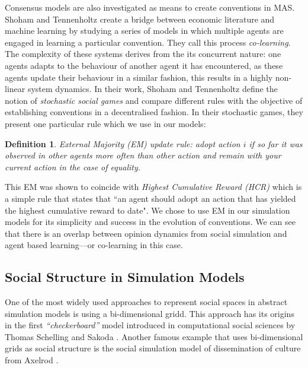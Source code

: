 \documentclass[preprint,number]{elsarticle}
\newtheorem{mydef}{Definition}
\begin{document}
	Consensus models are also investigated as means to create conventions in MAS. Shoham and Tennenholtz \cite{Shoham1994} create a bridge between economic literature and machine learning by studying a series of models in which multiple agents are engaged in learning a particular convention. They call this process \textit{co-learning}. The complexity of these systems derives from the its concurrent nature: one agents adapts to the behaviour of another agent it has encountered, as these agents update their behaviour in a similar fashion, this results in a highly non-linear system dynamics. In their work, Shoham and Tennenholtz define the notion of \textit{stochastic social games} and compare different rules with the objective of establishing conventions in a decentralised fashion. In their stochastic games, they present one particular rule which we use in our models: 
	
	\begin{mydef}
		\label{def:external-majority}
		\textit{External Majority (EM)} update rule: adopt action $i$ if so far it was observed in other agents more often than other action and remain with your current action in the case of equality. 
	\end{mydef}
	
	This EM was shown to coincide with \textit{Highest Cumulative Reward (HCR)} which is a simple rule that states that ``an agent should adopt an action that has yielded the highest cumulative reward to date". We chose to use EM in our simulation models for its simplicity and success in the evolution of conventions. We can see that there is an overlap between opinion dynamics from social simulation and agent based learning---or co-learning in this case.
	
	\subsection{Social Structure in Simulation Models}
	One of the most widely used approaches to represent social spaces in abstract simulation models is using a  bi-dimensional gridd. This approach has its origins in the first \textit{“checkerboard”} model introduced in computational social sciences by Thomas Schelling \cite{Schelling1971} and Sakoda \cite{Sakoda1971}. Another famous example that uses bi-dimensional grids as social structure is the social simulation model of dissemination of culture from Axelrod \cite{Axelrod1997}.
	
\end{document}
